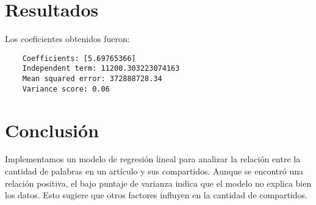 \documentclass{article}
\begin{document}
\section{Resultados}
Los coeficientes obtenidos fueron:
\begin{verbatim}
    Coefficients: [5.69765366]
    Independent term: 11200.303223074163
    Mean squared error: 372888728.34
    Variance score: 0.06
\end{verbatim}


\section{Conclusión}

Implementamos un modelo de regresión lineal para analizar la relación entre la cantidad de palabras en un artículo y sus compartidos. Aunque se encontró una relación positiva, el bajo puntaje de varianza indica que el modelo no explica bien los datos. Esto sugiere que otros factores influyen en la cantidad de compartidos.
\end{document}

